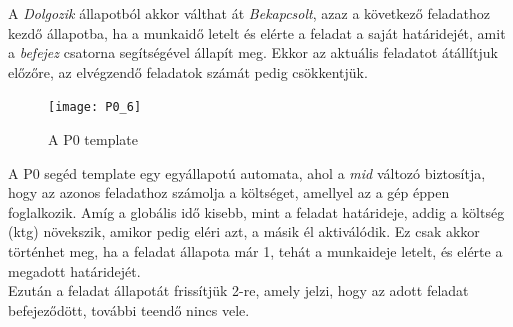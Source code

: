 \documentclass {report}
\begin{document}
A \emph{Dolgozik} állapotból akkor válthat át \emph{Bekapcsolt}, azaz a következő feladathoz kezdő állapotba, ha a munkaidő letelt és elérte a feladat a saját határidejét, amit a \emph{befejez} csatorna segítségével állapít meg. Ekkor az aktuális feladatot átállítjuk előzőre, az elvégzendő feladatok számát pedig csökkentjük.\\
\begin{figure}[htpb]
\begin{center}
\texttt{[image: P0\_6]}
\caption{A P0 template}
\end{center}
\end{figure}
A P0 segéd template egy egyállapotú automata, ahol a \emph{mid} változó biztosítja, hogy az azonos feladathoz számolja a költséget, amellyel az a gép éppen foglalkozik. Amíg a globális idő kisebb, mint a feladat határideje, addig a költség (ktg) növekszik, amikor pedig eléri azt, a másik él aktiválódik. Ez csak akkor történhet meg, ha a feladat állapota már 1, tehát a munkaideje letelt, és elérte a megadott határidejét. \\
Ezután a feladat állapotát frissítjük 2-re, amely jelzi, hogy az adott feladat befejeződött, további teendő nincs vele. 
\end{document}
